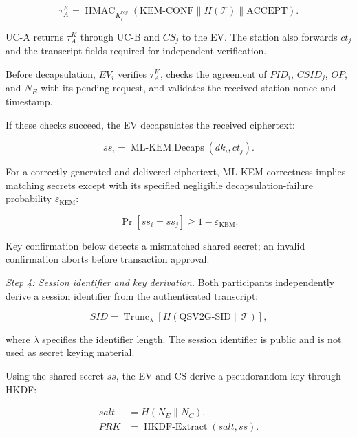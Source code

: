 \documentclass[twocolumn,10pt,journal]{IEEEtran}
\begin{document}
\begin{equation}
\tau_A^{K}
=
\operatorname{HMAC}_{K_i^{reg}}
\left(
\mathrm{KEM\mbox{-}CONF}
\parallel H(\mathcal{T})
\parallel \mathrm{ACCEPT}
\right).
\label{eq:qsv2g_kem_authority_conf}
\end{equation}

UC-A returns $\tau_A^{K}$ through UC-B and
$CS_j$ to the EV. The station also forwards
$ct_j$ and the transcript fields required
for independent verification.

Before decapsulation, $EV_i$ verifies
$\tau_A^{K}$, checks the agreement of $PID_i$,
$CSID_j$, $OP$, and $N_E$ with its pending
request, and validates the received station
nonce and timestamp.

If these checks succeed, the EV decapsulates
the received ciphertext:

\begin{equation}
ss_i
=
\operatorname{ML\mbox{-}KEM.Decaps}
(dk_i,ct_j).
\label{eq:qsv2g_kem_decaps}
\end{equation}

For a correctly generated and delivered ciphertext,
ML-KEM correctness implies matching secrets except with its
specified negligible decapsulation-failure probability
$\varepsilon_{\mathrm{KEM}}$:

\begin{equation}
\Pr[ss_i=ss_j]\ge 1-\varepsilon_{\mathrm{KEM}}.
\label{eq:qsv2g_kem_shared_secret}
\end{equation}

Key confirmation below detects a mismatched shared secret;
an invalid confirmation aborts before transaction approval.

\textit{Step 4: Session identifier and key derivation.}
Both participants independently derive a session
identifier from the authenticated transcript:

\begin{equation}
SID=
\operatorname{Trunc}_{\lambda}
\left[
H\left(
\mathrm{QSV2G\mbox{-}SID}
\parallel\mathcal{T}
\right)
\right],
\label{eq:qsv2g_session_id}
\end{equation}

where $\lambda$ specifies the identifier length.
The session identifier is public and is not
used as secret keying material.

Using the shared secret $ss$, the EV and CS
derive a pseudorandom key through HKDF:

\begin{equation}
\begin{aligned}
salt &=
H(N_E\parallel N_C),\\
PRK &=
\operatorname{HKDF\mbox{-}Extract}(salt,ss).
\end{aligned}
\label{eq:qsv2g_hkdf_extract}
\end{equation}
\end{document}
